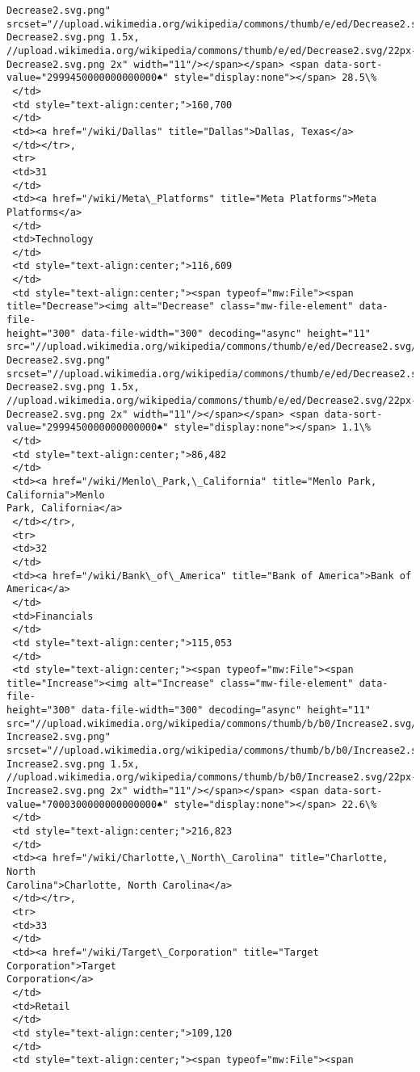\documentclass[11pt]{article}
\begin{document}
\begin{tcolorbox}[breakable, size=fbox, boxrule=.5pt, pad at break*=1mm, opacityfill=0]
\begin{Verbatim}[commandchars=\\\{\}]
Decrease2.svg.png"
srcset="//upload.wikimedia.org/wikipedia/commons/thumb/e/ed/Decrease2.svg/17px-
Decrease2.svg.png 1.5x,
//upload.wikimedia.org/wikipedia/commons/thumb/e/ed/Decrease2.svg/22px-
Decrease2.svg.png 2x" width="11"/></span></span> <span data-sort-
value="2999450000000000000♠" style="display:none"></span> 28.5\%
 </td>
 <td style="text-align:center;">160,700
 </td>
 <td><a href="/wiki/Dallas" title="Dallas">Dallas, Texas</a>
 </td></tr>,
 <tr>
 <td>31
 </td>
 <td><a href="/wiki/Meta\_Platforms" title="Meta Platforms">Meta Platforms</a>
 </td>
 <td>Technology
 </td>
 <td style="text-align:center;">116,609
 </td>
 <td style="text-align:center;"><span typeof="mw:File"><span
title="Decrease"><img alt="Decrease" class="mw-file-element" data-file-
height="300" data-file-width="300" decoding="async" height="11"
src="//upload.wikimedia.org/wikipedia/commons/thumb/e/ed/Decrease2.svg/11px-
Decrease2.svg.png"
srcset="//upload.wikimedia.org/wikipedia/commons/thumb/e/ed/Decrease2.svg/17px-
Decrease2.svg.png 1.5x,
//upload.wikimedia.org/wikipedia/commons/thumb/e/ed/Decrease2.svg/22px-
Decrease2.svg.png 2x" width="11"/></span></span> <span data-sort-
value="2999450000000000000♠" style="display:none"></span> 1.1\%
 </td>
 <td style="text-align:center;">86,482
 </td>
 <td><a href="/wiki/Menlo\_Park,\_California" title="Menlo Park, California">Menlo
Park, California</a>
 </td></tr>,
 <tr>
 <td>32
 </td>
 <td><a href="/wiki/Bank\_of\_America" title="Bank of America">Bank of America</a>
 </td>
 <td>Financials
 </td>
 <td style="text-align:center;">115,053
 </td>
 <td style="text-align:center;"><span typeof="mw:File"><span
title="Increase"><img alt="Increase" class="mw-file-element" data-file-
height="300" data-file-width="300" decoding="async" height="11"
src="//upload.wikimedia.org/wikipedia/commons/thumb/b/b0/Increase2.svg/11px-
Increase2.svg.png"
srcset="//upload.wikimedia.org/wikipedia/commons/thumb/b/b0/Increase2.svg/17px-
Increase2.svg.png 1.5x,
//upload.wikimedia.org/wikipedia/commons/thumb/b/b0/Increase2.svg/22px-
Increase2.svg.png 2x" width="11"/></span></span> <span data-sort-
value="7000300000000000000♠" style="display:none"></span> 22.6\%
 </td>
 <td style="text-align:center;">216,823
 </td>
 <td><a href="/wiki/Charlotte,\_North\_Carolina" title="Charlotte, North
Carolina">Charlotte, North Carolina</a>
 </td></tr>,
 <tr>
 <td>33
 </td>
 <td><a href="/wiki/Target\_Corporation" title="Target Corporation">Target
Corporation</a>
 </td>
 <td>Retail
 </td>
 <td style="text-align:center;">109,120
 </td>
 <td style="text-align:center;"><span typeof="mw:File"><span

\end{Verbatim}
\end{tcolorbox}
\end{document}
